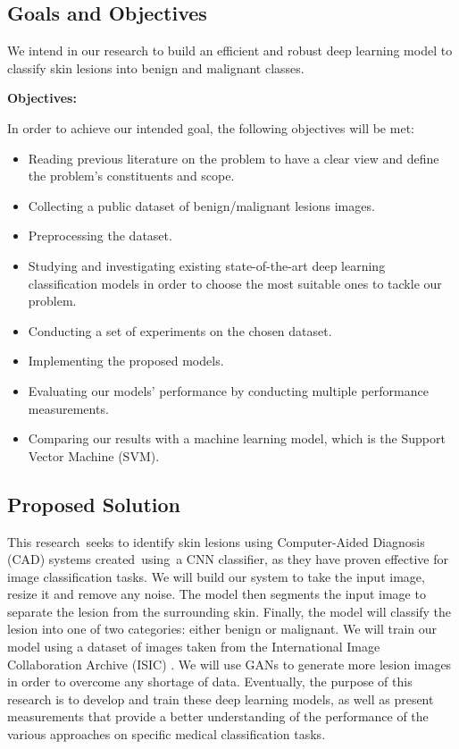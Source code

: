 \documentclass[12pt]{diazessay}
\begin{document}
    \subsection{Goals and Objectives} \label{section:Goals-and-Objectives}
    \hspace{0.7cm} We intend in our research to build an efficient and robust deep learning model to classify skin lesions into benign and malignant classes. 
    
    \textbf{Objectives:}
    
    In order to achieve our intended goal, the following objectives will be met:
    \begin{itemize}
         \item Reading previous literature on the problem to have a clear view and define the problem's constituents and scope.
         \item Collecting a public dataset of benign/malignant lesions images.
         \item Preprocessing the dataset.
         \item Studying and investigating existing state-of-the-art deep learning classification models in order to choose the most suitable ones to tackle our problem.
         \item Conducting a set of experiments on the chosen dataset.
         \item Implementing the proposed models.
         \item Evaluating our models' performance by conducting multiple performance measurements.
         \item Comparing our results with a machine learning model, which is the Support Vector Machine (SVM).
    \end{itemize}
    
    \newpage
    \subsection{Proposed Solution}
    \hspace{0.7cm} This research seeks to identify skin lesions using Computer-Aided Diagnosis (CAD) systems created using a CNN classifier, as they have proven effective for image classification tasks. We will build our system to take the input image, resize it and remove any noise. The model then segments the input image to separate the lesion from the surrounding skin. Finally, the model will classify the lesion into one of two categories: either benign or malignant. We will train our model using a dataset of images taken from the International Image Collaboration Archive (ISIC) \cite{ISICdataset}. We will use GANs to generate more lesion images in order to overcome any shortage of data. Eventually, the purpose of this research is to develop and train these deep learning models, as well as present measurements that provide a better understanding of the performance of the various approaches on specific medical classification tasks.
    
\end{document}
